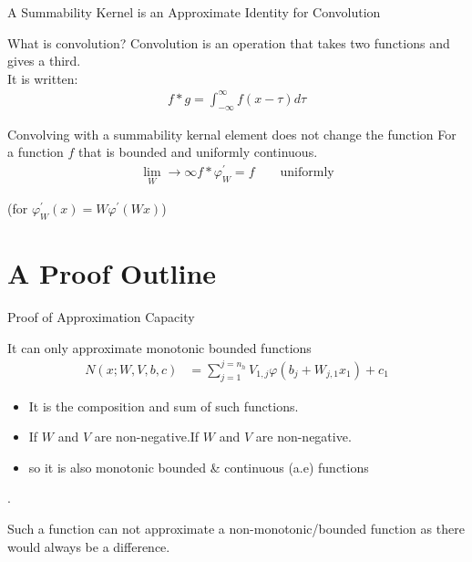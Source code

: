 \documentclass[dvipsnames,handout]{beamer}
\begin{document}
\begin{frame}{A Summability Kernel is an Approximate Identity for Convolution}
	\begin{block}{What is convolution?}
		Convolution is an operation that takes two functions and gives a third.\\
		It is written:
		\begin{align*}
			f \ast g = \int_{-\infty}^\infty f(x-\tau) d\tau
		\end{align*}
	\end{block}
	
	\begin{block}{Convolving with a summability kernal element does not change the function}
		For a function $f$ that is bounded and uniformly continuous.
		\begin{align*}
			\lim_W\to\infty	f\ast\varphi_W^\prime = f		\qquad \text{uniformly}
		\end{align*}
		
		\hfill (for $\varphi^\prime_W(x)=W\varphi^\prime(Wx)$)
	\end{block}
\end{frame}

\section{A Proof Outline}

\begin{frame}{Proof of Approximation Capacity}

\end{frame}


\begin{frame}{It can only approximate monotonic bounded functions}
	\begin{align*}
		N(x;W,V,b,c) &= \sum_{j=1}^{j=n_h} V_{1,j} \varphi (b_j+W_{j,1}x_1) + c_1
	\end{align*}
	\begin{itemize}
		\item It is the composition and sum of such functions.
		\item If $W$ and $V$ are non-negative.If $W$ and $V$ are non-negative.
		\item so it is also monotonic bounded \& continuous (a.e) functions
	\end{itemize}

	.
	
	Such a function can not approximate a non-monotonic/bounded function as there would always be a difference.
\end{frame}
\end{document}
